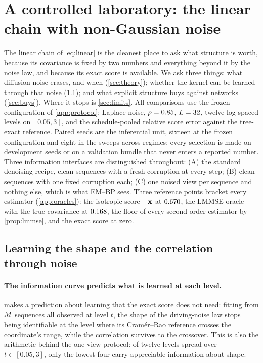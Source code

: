 \section{A controlled laboratory: the linear chain with non-Gaussian noise}
\label{sec:experiments}

The linear chain of \cref{eq:linear} is the cleanest place to ask what structure is worth, because its
covariance is fixed by two numbers and everything beyond it by the noise law, and because its exact score is
available. We ask three things: what diffusion noise erases, and when (\cref{sec:theory}); whether the
kernel can be learned through that noise (\cref{sec:learning-results}); and what explicit structure buys
against networks (\cref{sec:buys}). Where it stops is \cref{sec:limits}. All comparisons use the frozen
configuration of \cref{app:protocol}: Laplace noise, $\rho=0.85$, $L=32$, twelve log-spaced levels on
$[0.05,3]$, and the schedule-pooled relative score error against the tree-exact reference. Paired seeds are
the inferential unit, sixteen at the frozen configuration and eight in the sweeps across regimes; every
selection is made on development seeds or on a validation bundle that never enters a reported number.
Three information interfaces are distinguished throughout: (A) the standard denoising recipe, clean sequences
with a fresh corruption at every step; (B) clean sequences with one fixed corruption each; (C) one noised
view per sequence and nothing else, which is what EM--BP sees. Three reference points bracket every estimator
(\cref{app:oracles}): the isotropic score $-\mathbf{x}$ at $0.670$, the LMMSE oracle with the true
covariance at $0.168$, the floor of every second-order estimator by \cref{prop:lmmse}, and the
exact score at zero.



\subsection{Learning the shape and the correlation through noise}
\label{sec:learning-results}

\paragraph{The information curve predicts what is learned at each level.}
 makes a prediction about learning that the exact score does not need: fitting from
$M$ sequences all observed at level $t$, the shape of the driving-noise law stops being identifiable at
the level where its Cram\'er--Rao reference crosses the coordinate's range, while the correlation survives to
the crossover. This is also the arithmetic behind the one-view protocol: of twelve levels spread over
$t\in[0.05,3]$, only the lowest four carry appreciable information about shape.

